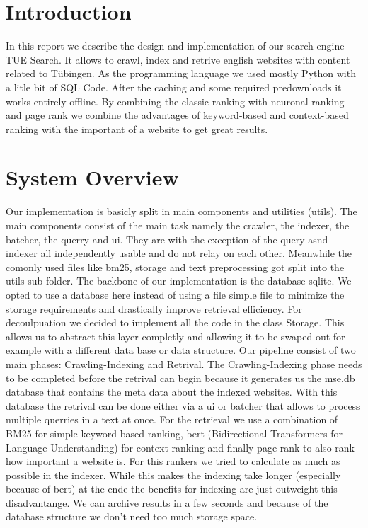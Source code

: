 \section{Introduction}
In this report we describe the design and implementation of our search engine TUE Search. It allows to crawl, index and retrive english websites with content related to Tübingen.
As the programming language we used mostly Python with a litle bit of SQL Code. After the caching and some required predownloads it works entirely offline.
By combining the classic ranking with neuronal ranking and page rank we combine the advantages of keyword-based and context-based ranking with the important of a website to get great results.

\section{System Overview}

Our implementation is basicly split in main components and utilities (utils). The main components consist of the main task namely the crawler, the indexer, the batcher, the querry and ui. They are with the exception of the query asnd indexer all independently usable and do not relay on each other. Meanwhile the comonly used files like bm25, storage and text preprocessing got split into the utils sub folder.
The backbone of our implementation is the database sqlite. We opted to use a database here instead of using a file simple file to minimize the storage requirements and drastically improve retrieval efficiency.
For decoulpuation we decided to implement all the code in the class Storage. This allows us to abstract this layer completly and allowing it to be swaped out for example with a different data base or data structure.
Our pipeline consist of two main phases: Crawling-Indexing and Retrival. The Crawling-Indexing phase needs to be completed before the retrival can begin because it generates us the mse.db database that contains the meta data about the indexed websites.
With this database the retrival can be done either via a ui or batcher that allows to process multiple querries in a text at once. For the retrieval we use a combination of BM25 for simple keyword-based ranking, bert (Bidirectional Transformers for Language Understanding) for context ranking and finally page rank to also rank how important a website is. For this rankers we tried to calculate as much as possible in the indexer. While this makes the indexing take longer (especially because of bert) at the ende the benefits for indexing are just outweight this disadvantange. We can archive results in a few seconds and because of the database structure we don't need too much storage space.


